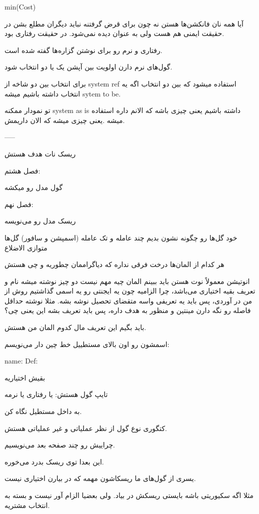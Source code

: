 min(Cost)

آیا همه نان فانکشن‌ها هستن نه
چون برای قرض گرفتنه نباید دیگران مطلع بشن در حقیقت ایمنی هم هست ولی به عنوان
 دیده نمی‌شود. در حقیقت رفتاری بود.

رفتاری و نرم رو برای نوشتن گزاره‌ها گفته شده است.

گول‌های نرم دارن اولویت بین آپشن یک یا دو انتخاب شود.

برای انتخاب بین دو شاخه از system ref استفاده میشود که بین دو انتخاب اگه یه
انتخاب داشته باشیم میشه sytem to be.

تو نمودار ممکنه system as is داشته باشیم یعنی چیزی باشه که الانم داره استفاده
میشه .یعنی چیزی میشه که الان داریمش.


-----

ریسک نات هدف هستش

فصل هشتم:

گول مدل رو میکشه

فصل نهم:

ریسک مدل رو می‌نویسه

خود گل‌ها رو چگونه نشون بدیم
چند عامله و تک عامله (اسمپشن و سافور) گل‌ها متوازی الاضلاع

هر کدام از المان‌ها درخت فرقی نداره که دیاگراممان چطوریه و چی هستش

انوتیشن معمولاً نوت هستن باید ببینم المان چیه مهم نیست دو چیز نوشته میشه نام و
تعریف بقیه اختیاری می‌باشد، چرا الزامیه چون یه ایجنتی رو یه اسمی گذاشتیم روش از
من در آوردی، پس باید یه تعریفی واسه متقضای تحصیل نوشه بشه. مثلا نوشته حداقل
فاصله رو نگه دارن مینتین و منظور به هدف داره، پس باید تعریف بشه این یعنی چی؟

باید بگیم این تعریف مال کدوم المان من هستش.

اسمشون رو اون بالای مستطییل خط چین دار می‌نویسم:

name:
Def:

بقیش اختیاریه

تایپ گول هستش: یا رفتاری یا نرمه

به داخل مستطیل نگاه کن.

کتگوری نوع گول از نظر عملیاتی و غیر عملیاتی هستش.

چراییش رو چند صفحه بعد می‌نویسیم.

این بعدا توی ریسک بدرد می‌خوره.

یسری از گول‌های ما ریسکاشون مهمه که در بیارن اختیاری نیست.

مثلا اگه سکیوریتی باشه بایستی ریسکش در بیاد. ولی بعضیا الزام آور نیست و بسته به
انتخاب مشتریه.

